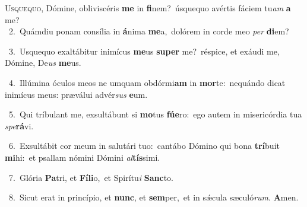 \lettrine{\initial\textcolor{\initialcolor}{U}}{squequo,} Dómine, obliviscéris \textbf{me} in \textbf{fi}\-nem?~\star úsquequo avértis fáciem tu\textit{am} \textbf{a} me?\\
{\numbfont\textcolor{\numbcolor}{~2.}}~Quámdiu ponam consília in \textbf{á}\-nima \textbf{me}\-a,~\star dolórem in corde meo \textit{per} \textbf{di}\-em?\par
{\numbfont\textcolor{\numbcolor}{~3.}}~Usquequo exaltábitur inimícus \textbf{me}\-us \textbf{su}\-\textbf{per} me?~\star réspice, et exáudi me, Dómine, De\textit{us} \textbf{me}\-us.\par
{\numbfont\textcolor{\numbcolor}{~4.}}~Illúmina óculos meos ne umquam obdórmi\textbf{am} in \textbf{mor}\-te:~\star nequándo dicat inimícus meus: præválui advér\textit{sus} \textbf{e}\-um.\par
{\numbfont\textcolor{\numbcolor}{~5.}}~Qui tríbulant me, exsultábunt si \textbf{mo}\-tus \textbf{fú}\-\textbf{e}ro:~\star ego autem in misericórdia tua \textit{spe}\-\textbf{rá}vi.\par
{\numbfont\textcolor{\numbcolor}{~6.}}~Exsultábit cor meum in salutári tuo:~\dagger cantábo Dómino qui bona \textbf{trí}\-buit \textbf{mi}\-hi:~\star et psallam nómini Dómini \textit{al}\-\textbf{tís}simi.\par
{\numbfont\textcolor{\numbcolor}{~7.}}~Glória \textbf{Pa}\-tri, et \textbf{Fí}\-\textbf{li}o,~\star et Spirítu\textit{i} \textbf{Sanc}\-to.\par
{\numbfont\textcolor{\numbcolor}{~8.}}~Sicut erat in princípio, et \textbf{nunc}\-, et \textbf{sem}\-per,~\star et in sǽcula sæculó\-\textit{rum}\-. \textbf{A}\-men.\par

